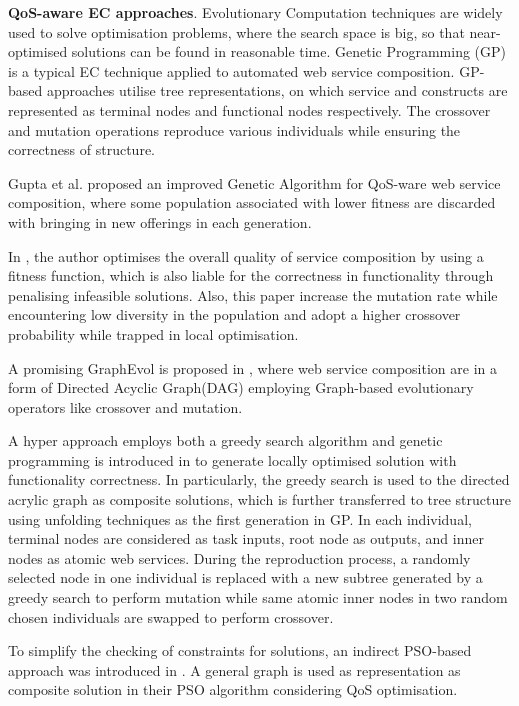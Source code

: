 \documentclass{IEEEtran}
\begin{document}
\textbf{QoS-aware EC approaches}. Evolutionary Computation techniques are widely used to solve optimisation problems, where the search space is big, so that near-optimised solutions can be found in reasonable time. Genetic Programming (GP) \cite{da2015graphevol} is a typical EC technique applied to automated web service composition. GP-based approaches utilise tree representations, on which service and constructs are represented as terminal nodes and functional nodes respectively. The crossover and mutation operations reproduce various individuals while ensuring the correctness of structure. 

Gupta et al. \cite{gupta2015optimization} proposed an improved Genetic Algorithm for QoS-ware web service composition, where some population associated with lower fitness are discarded with bringing in new offerings in each generation.

In \cite{yu2013adaptive}, the author optimises the overall quality of service composition by using a fitness function, which is also liable for the correctness in functionality through penalising infeasible solutions. Also, this paper increase the mutation rate while encountering low diversity in the population and adopt a higher crossover probability while trapped in local optimisation.

A promising GraphEvol is proposed in \cite{da2015graphevol}, where web service composition are in a form of Directed Acyclic Graph(DAG) employing Graph-based evolutionary operators like crossover and mutation.

A hyper approach employs both a greedy search algorithm and genetic programming is introduced in \cite{ma2015hybrid} to generate locally optimised solution with functionality correctness. In particularly, the greedy search is used to the directed acrylic graph as composite solutions, which is further transferred to tree structure using unfolding techniques as the first generation in GP. In each individual,  terminal nodes are considered as task inputs,  root node as outputs, and inner nodes as atomic web services. During the reproduction process,  a randomly selected node in one individual is replaced with a new subtree generated by a greedy search to perform mutation while same atomic inner nodes in two random chosen individuals are swapped to perform crossover.

To simplify the checking of constraints for solutions, an indirect PSO-based approach was introduced in \cite{da2016particle}. A general graph is used as representation as composite solution in their PSO algorithm considering QoS optimisation. 
\end{document}
